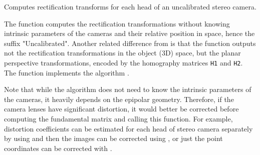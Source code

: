 Computes rectification transforms for each head of an uncalibrated stereo camera.

\begin{description}
\end{description}

The function computes the rectification transformations without knowing intrinsic parameters of the cameras and their relative position in space, hence the suffix "Uncalibrated". Another related difference from  is that the function outputs not the rectification transformations in the object (3D) space, but the planar perspective transformations, encoded by the homography matrices \texttt{H1} and \texttt{H2}. The function implements the algorithm \cite{Hartley99}. 

Note that while the algorithm does not need to know the intrinsic parameters of the cameras, it heavily depends on the epipolar geometry. Therefore, if the camera lenses have significant distortion, it would better be corrected before computing the fundamental matrix and calling this function. For example, distortion coefficients can be estimated for each head of stereo camera separately by using  and then the images can be corrected using , or just the point coordinates can be corrected with . 

